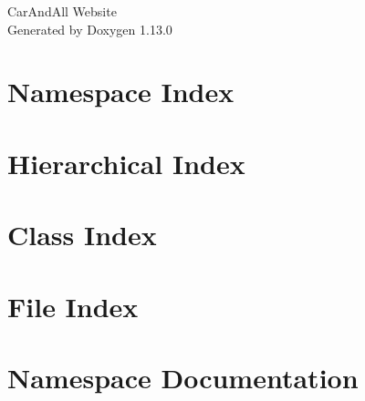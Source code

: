 \documentclass[twoside]{book}
\newcommand{\+}{\discretionary{\mbox{\scriptsize$\hookleftarrow$}}{}{}}
\newcommand{\clearemptydoublepage}{%
    \newpage{\pagestyle{empty}\cleardoublepage}%
  }
\begin{document}
  \raggedbottom
    \hypersetup{pageanchor=false,
                bookmarksnumbered=true,
                pdfencoding=unicode
               }
  \begin{titlepage}
  \vspace*{7cm}
  \begin{center}%
  {\Large Car\+And\+All Website}\\
  \vspace*{1cm}
  {\large Generated by Doxygen 1.13.0}\\
  \end{center}
  \end{titlepage}
  \clearemptydoublepage
  \tableofcontents
  \clearemptydoublepage
  \hypersetup{pageanchor=true}
\chapter{Namespace Index}

\chapter{Hierarchical Index}

\chapter{Class Index}

\chapter{File Index}

\chapter{Namespace Documentation}






























\end{document}
